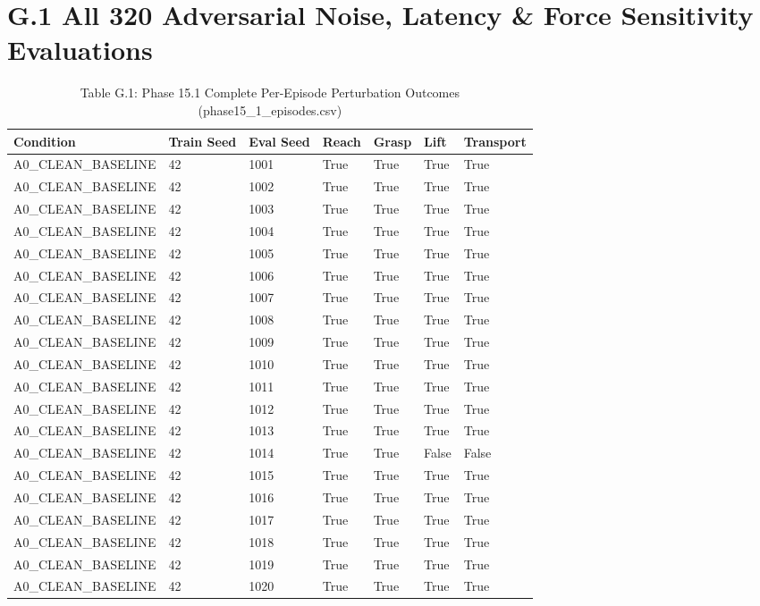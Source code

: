 \documentclass[11pt,a4paper,oneside]{book}
\begin{document}
\section{G.1 All 320 Adversarial Noise, Latency \& Force Sensitivity Evaluations}
\begin{longtable}{l l l l l l l}\caption{Table G.1: Phase 15.1 Complete Per-Episode Perturbation Outcomes (phase15\_1\_episodes.csv)}\\\toprule
Condition & Train Seed & Eval Seed & Reach & Grasp & Lift & Transport \\ \midrule \endhead
A0\_CLEAN\_BASELINE & 42 & 1001 & True & True & True & True \\
A0\_CLEAN\_BASELINE & 42 & 1002 & True & True & True & True \\
A0\_CLEAN\_BASELINE & 42 & 1003 & True & True & True & True \\
A0\_CLEAN\_BASELINE & 42 & 1004 & True & True & True & True \\
A0\_CLEAN\_BASELINE & 42 & 1005 & True & True & True & True \\
A0\_CLEAN\_BASELINE & 42 & 1006 & True & True & True & True \\
A0\_CLEAN\_BASELINE & 42 & 1007 & True & True & True & True \\
A0\_CLEAN\_BASELINE & 42 & 1008 & True & True & True & True \\
A0\_CLEAN\_BASELINE & 42 & 1009 & True & True & True & True \\
A0\_CLEAN\_BASELINE & 42 & 1010 & True & True & True & True \\
A0\_CLEAN\_BASELINE & 42 & 1011 & True & True & True & True \\
A0\_CLEAN\_BASELINE & 42 & 1012 & True & True & True & True \\
A0\_CLEAN\_BASELINE & 42 & 1013 & True & True & True & True \\
A0\_CLEAN\_BASELINE & 42 & 1014 & True & True & False & False \\
A0\_CLEAN\_BASELINE & 42 & 1015 & True & True & True & True \\
A0\_CLEAN\_BASELINE & 42 & 1016 & True & True & True & True \\
A0\_CLEAN\_BASELINE & 42 & 1017 & True & True & True & True \\
A0\_CLEAN\_BASELINE & 42 & 1018 & True & True & True & True \\
A0\_CLEAN\_BASELINE & 42 & 1019 & True & True & True & True \\
A0\_CLEAN\_BASELINE & 42 & 1020 & True & True & True & True \\

\end{longtable}
\end{document}
